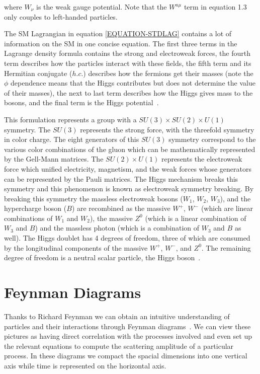 \noindent where $W_\nu$ is the weak gauge potential. Note that the $W^{a \mu}$ term in equation 1.3 only couples to left-handed particles. 

The SM Lagrangian in equation \ref{EQUATION-STDLAG} contains a lot of information on the SM in one concise equation. The first three terms in the Lagrange density formula contains the strong and electroweak forces, the fourth term describes how the particles interact with these fields, the fifth term and its Hermitian conjugate ($h.c.$) describes how the fermions get their masses (note the $\phi$ dependence means that the Higgs contributes but does not determine the value of their masses), the next to last term describes how the Higgs gives mass to the bosons, and the final term is the Higgs potential~\cite{Griffiths,QFT-PS,QFT-IZ}. 

This formulation represents a group with a $SU(3) \times SU(2) \times U(1)$ symmetry. The $SU(3)$ represents the strong force, with the threefold symmetry in color charge. The eight generators of this $SU(3)$ symmetry correspond to the various color combinations of the gluon which can be mathematically represented by the Gell-Mann matrices. The $SU(2) \times U(1)$ represents the electroweak force which unified electricity, magnetism, and the weak forces whose generators can be represented by the Pauli matrices. The Higgs mechanism breaks this symmetry and this phenomenon is known as electroweak symmetry breaking. By breaking this symmetry the massless electroweak bosons ($W_1$, $W_2$, $W_3$), and the hypercharge boson ($B$) are recombined as the massive $W^+$, $W^-$ (which are linear combinations of $W_1$ and $W_2$), the massive $Z^0$ (which is a linear combination of $W_3$ and $B$) and the massless photon (which is a combination of $W_3$ and $B$ as well). The Higgs doublet has 4 degrees of freedom, three of which are consumed by the longitudinal components of the massive $W^+$, $W^-$, and $Z^0$. The remaining degree of freedom is a neutral scalar particle, the Higgs boson~\cite{GROUPTHEORY,GROUPTHEORY2}. 

\section{Feynman Diagrams}
\label{SECTION-FEYNMANN-DIAGRAMS}

Thanks to Richard Feynman we can obtain an intuitive understanding of particles and their interactions through Feynman diagrams~\cite{QFT-PS}. We can view these pictures as having direct correlation with the processes involved and even set up the relevant equations to compute the scattering amplitude of a particular process. In these diagrams we compact the spacial dimensions into one vertical axis while time is represented on the horizontal axis. %

